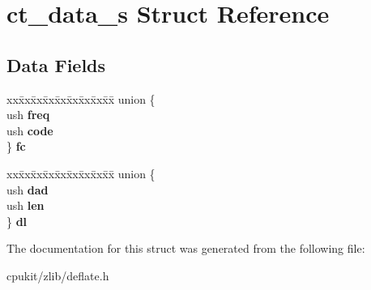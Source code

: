 \hypertarget{structct__data__s}{}\section{ct\+\_\+data\+\_\+s Struct Reference}
\label{structct__data__s}
\subsection*{Data Fields}
\begin{DoxyCompactItemize}
\item 
\mbox{\label{structct__data__s_a2597590c157f6dafb04567dd1051f0ba}} 
\begin{tabbing}
xx\=xx\=xx\=xx\=xx\=xx\=xx\=xx\=xx\=\kill
union \{\\
\>ush {\bfseries freq}\\
\>ush {\bfseries code}\\
\} {\bfseries fc}\\

\end{tabbing}\item 
\mbox{\label{structct__data__s_a9712a9d1b02ad54ba2ab914dfb96bb5b}} 
\begin{tabbing}
xx\=xx\=xx\=xx\=xx\=xx\=xx\=xx\=xx\=\kill
union \{\\
\>ush {\bfseries dad}\\
\>ush {\bfseries len}\\
\} {\bfseries dl}\\

\end{tabbing}\end{DoxyCompactItemize}


The documentation for this struct was generated from the following file\+:\begin{DoxyCompactItemize}
\item 
cpukit/zlib/deflate.\+h\end{DoxyCompactItemize}
